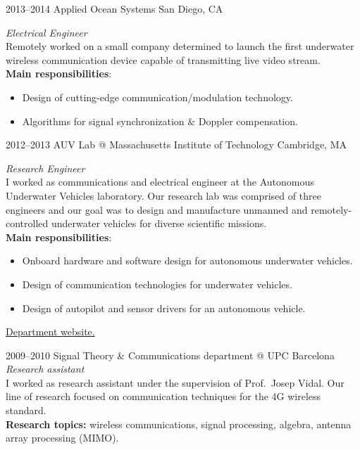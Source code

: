 \documentclass[]{friggeri-cv} %
\begin{document}
\begin{entrylist}

\entry
{2013--2014}
{Applied Ocean Systems}
{San Diego, CA}
{%
\emph{Electrical Engineer} \\
Remotely worked on a small company determined to launch the first
underwater wireless communication device capable of transmitting live
video stream. \\
{\bf Main responsibilities}:
  \begin{itemize}
    \item Design of cutting-edge communication/modulation technology.
    \item Algorithms for signal synchronization \& Doppler compensation.
  \end{itemize}
}


\entry
{2012--2013}
{AUV Lab @ Massachusetts Institute of Technology}
{Cambridge, MA}
{%
\emph{Research Engineer} \\
I worked as communications and electrical engineer at the Autonomous
Underwater Vehicles laboratory. Our research lab was comprised of
three engineers and our goal was to design and manufacture unmanned
and remotely-controlled underwater vehicles for diverse scientific
missions.\\
{\bf Main responsibilities}:
  \begin{itemize}
    \item Onboard hardware and software design for autonomous
      underwater vehicles.
    \item Design of communication technologies for underwater
      vehicles.
    \item Design of autopilot and sensor drivers for an autonomous vehicle.
  \end{itemize}
\href{http://seagrant.mit.edu}{{\FA\faExternalLink} Department website.}
}


\entry
{2009--2010}
{Signal Theory \& Communications department @ UPC}
{Barcelona}
{%
\emph{Research assistant} \\
I worked as research assistant under the supervision of Prof.\ Josep
Vidal. Our line of research focused on communication techniques for the 4G
wireless standard. \\
{\bf Research topics:} wireless communications, signal processing,
algebra, antenna array processing (MIMO).
}



\end{entrylist}
\end{document}
